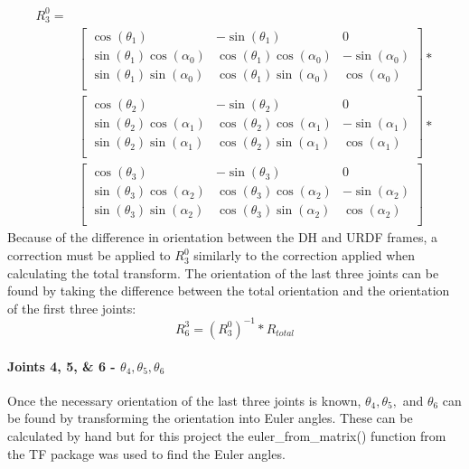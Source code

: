 \documentclass{article}
\begin{document}
\[
\begin{split} R^0_3 = \\
& \begin{bmatrix}
    \cos(\theta _1) & -\sin(\theta _1) & 0 \\
    \sin(\theta _1)\cos(\alpha _{0}) & \cos(\theta _1)\cos(\alpha _{0}) & -\sin(\alpha _{0}) \\
    \sin(\theta _1)\sin(\alpha _{0}) & \cos(\theta _1)\sin(\alpha _{0}) & \cos(\alpha _{0}) \\
\end{bmatrix}
* \\
& \begin{bmatrix}
    \cos(\theta _2) & -\sin(\theta _2) & 0 \\
    \sin(\theta _2)\cos(\alpha _{1}) & \cos(\theta _2)\cos(\alpha _{1}) & -\sin(\alpha _{1}) \\
    \sin(\theta _2)\sin(\alpha _{1}) & \cos(\theta _2)\sin(\alpha _{1}) & \cos(\alpha _{1}) \\
\end{bmatrix}
* \\
& \begin{bmatrix}
    \cos(\theta _3) & -\sin(\theta _3) & 0 \\
    \sin(\theta _3)\cos(\alpha _{2}) & \cos(\theta _3)\cos(\alpha _{2}) & -\sin(\alpha _{2}) \\
    \sin(\theta _3)\sin(\alpha _{2}) & \cos(\theta _3)\sin(\alpha _{2}) & \cos(\alpha _{2}) \\
\end{bmatrix}
\end{split}
\]
Because of the difference in orientation between the DH and URDF frames, a correction must be applied to $R^0_3$ similarly to the correction applied when calculating the total transform.
The orientation of the last three joints can be found by taking the difference between the total orientation and the orientation of the first three joints:
\[R^3_6 = (R^0_3)^{-1} * R_{total}\]

\paragraph{Joints 4, 5, \& 6 - $\theta _4, \theta _5, \theta _6$}
Once the necessary orientation of the last three joints is known, $\theta _4, \theta _5,$ and $\theta _6$ can be found by transforming the orientation into Euler angles. These can be calculated by hand but for this project the euler\_from\_matrix() function from the TF package was used to find the Euler angles.
\end{document}
